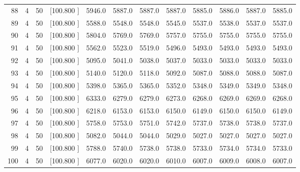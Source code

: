 \documentclass[12pt,a4paper]{article}
\begin{document}
\begin{center}
{\begin{tabular}{r r r r r r r r r r r r}
  88&  4& 50&[100.800   ]&  5946.0&  5887.0&  5887.0&  5887.0&  5885.0&  5886.0&  5887.0&  5885.0\\[-0.02in]
  89&  4& 50&[100.800   ]&  5588.0&  5548.0&  5548.0&  5545.0&  5537.0&  5538.0&  5537.0&  5537.0\\[-0.02in]
  90&  4& 50&[100.800   ]&  5804.0&  5769.0&  5769.0&  5757.0&  5755.0&  5755.0&  5755.0&  5755.0\\[-0.02in]
  91&  4& 50&[100.800   ]&  5562.0&  5523.0&  5519.0&  5496.0&  5493.0&  5493.0&  5493.0&  5493.0\\[-0.02in]
  92&  4& 50&[100.800   ]&  5095.0&  5041.0&  5038.0&  5037.0&  5033.0&  5033.0&  5033.0&  5033.0\\[-0.02in]
  93&  4& 50&[100.800   ]&  5140.0&  5120.0&  5118.0&  5092.0&  5087.0&  5088.0&  5088.0&  5087.0\\[-0.02in]
  94&  4& 50&[100.800   ]&  5398.0&  5365.0&  5365.0&  5352.0&  5348.0&  5349.0&  5349.0&  5348.0\\[-0.02in]
  95&  4& 50&[100.800   ]&  6333.0&  6279.0&  6279.0&  6273.0&  6268.0&  6269.0&  6269.0&  6268.0\\[-0.02in]
  96&  4& 50&[100.800   ]&  6218.0&  6153.0&  6153.0&  6150.0&  6149.0&  6150.0&  6150.0&  6149.0\\[-0.02in]
  97&  4& 50&[100.800   ]&  5758.0&  5753.0&  5751.0&  5742.0&  5737.0&  5738.0&  5738.0&  5737.0\\[-0.02in]
  98&  4& 50&[100.800   ]&  5082.0&  5044.0&  5044.0&  5029.0&  5027.0&  5027.0&  5027.0&  5027.0\\[-0.02in]
  99&  4& 50&[100.800   ]&  5788.0&  5740.0&  5738.0&  5738.0&  5733.0&  5734.0&  5734.0&  5733.0\\[-0.02in]
 100&  4& 50&[100.800   ]&  6077.0&  6020.0&  6020.0&  6010.0&  6007.0&  6009.0&  6008.0&  6007.0\\[-0.02in]

\hline
\end{tabular}}
\end{center}
\newpage
\end{document}
